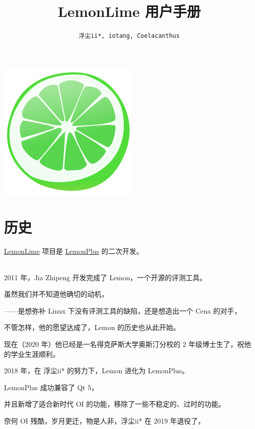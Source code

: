 \documentclass[UTF-8]{ctexart}
\title{\textbf{\huge LemonLime 用户手册}}
\author{\texttt{浮尘ii*, iotang, Coelacanthus}}
\begin{document}
	\maketitle

	\begin{center}
	\includegraphics[scale=0.5]{pics/icon.png}
	\end{center}
	\newpage

	\tableofcontents

	\newpage

	\section{历史}

		\href{https://github.com/Project-LemonLime/Project_LemonLime}{LemonLime} 项目是 \href{https://github.com/Dust1404/Project_LemonPlus}{LemonPlus} 的二次开发。

		~\\

		2011 年，Jia Zhipeng 开发完成了 Lemon，一个开源的评测工具。

		虽然我们并不知道他确切的动机，

		——是想弥补 Linux 下没有评测工具的缺陷，还是想造出一个 Cena 的对手，

		不管怎样，他的愿望达成了，Lemon 的历史也从此开始。

		现在（2020 年）他已经是一名得克萨斯大学奥斯汀分校的 2 年级博士生了，祝他的学业生涯顺利。\newline

		2018 年，在 浮尘ii* 的努力下，Lemon 进化为 LemonPlus。

		LemonPlus 成功兼容了 Qt 5，

		并且新增了适合新时代 OI 的功能，移除了一些不稳定的、过时的功能。

		奈何 OI 残酷，岁月更迁，物是人非，浮尘ii* 在 2019 年退役了，
\end{document}
